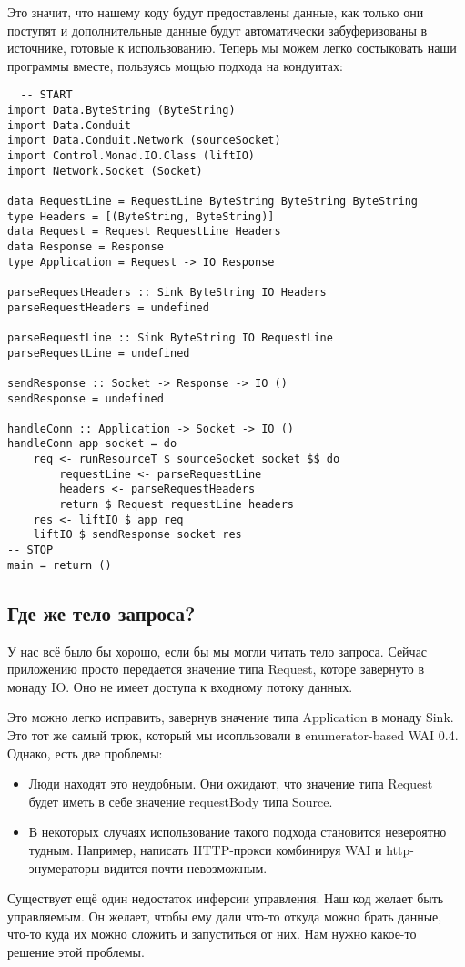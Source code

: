 Это значит, что нашему коду будут предоставлены данные, как только они поступят и дополнительные данные будут автоматически забуферизованы в источнике, готовые к использованию. Теперь мы можем легко состыковать наши программы вместе, пользуясь мощью подхода на кондуитах:
\begin{lstlisting}
  -- START
import Data.ByteString (ByteString)
import Data.Conduit
import Data.Conduit.Network (sourceSocket)
import Control.Monad.IO.Class (liftIO)
import Network.Socket (Socket)

data RequestLine = RequestLine ByteString ByteString ByteString
type Headers = [(ByteString, ByteString)]
data Request = Request RequestLine Headers
data Response = Response
type Application = Request -> IO Response

parseRequestHeaders :: Sink ByteString IO Headers
parseRequestHeaders = undefined

parseRequestLine :: Sink ByteString IO RequestLine
parseRequestLine = undefined

sendResponse :: Socket -> Response -> IO ()
sendResponse = undefined

handleConn :: Application -> Socket -> IO ()
handleConn app socket = do
    req <- runResourceT $ sourceSocket socket $$ do
        requestLine <- parseRequestLine
        headers <- parseRequestHeaders
        return $ Request requestLine headers
    res <- liftIO $ app req
    liftIO $ sendResponse socket res
-- STOP
main = return ()
\end{lstlisting}
\subsection{Где же тело запроса?}
У нас всё было бы хорошо, если бы мы могли читать тело
запроса. Сейчас
приложению просто передается значение типа Request, которе завернуто в монаду IO. 
Оно не имеет доступа к входному потоку данных.

Это можно легко исправить, завернув значение типа Application в монаду Sink. 
Это тот же самый трюк, который мы исопльзовали в enumerator-based WAI 0.4. 
Однако, есть две проблемы:

\begin{itemize}
\item Люди находят это неудобным. Они ожидают, что значение типа Request будет иметь в себе значение requestBody типа Source.
\item В некоторых случаях использование такого подхода становится невероятно тудным. Например, написать HTTP-прокси комбинируя WAI и http-энумераторы видится почти невозможным.
\end{itemize}
Существует ещё один недостаток инферсии управления. Наш код желает быть управляемым.
Он желает, чтобы ему дали что-то откуда можно брать данные, что-то куда их можно сложить и запуститься от них. Нам нужно какое-то решение этой проблемы.

